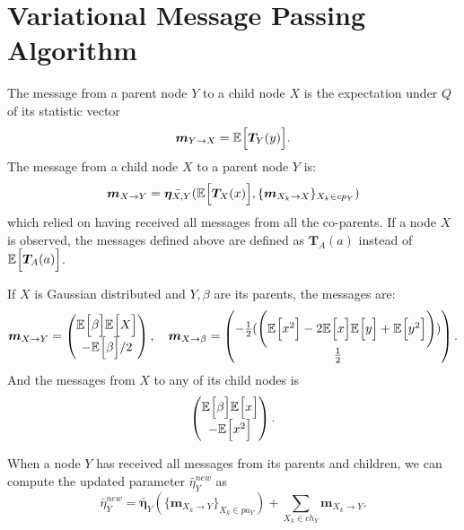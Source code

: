 \section{Variational Message Passing Algorithm}

The message from a parent node \( Y \) to a child node \( X \) is the expectation under \( Q \) of its statistic vector
\[
      \bm{m}_{Y \to X} = \mathbb{E}_{}\Big[\bm{T}_Y(y)\Big].
\]
The message from a child node \( X \) to a parent node \( Y \) is:
\[
      \bm{m}_{X \to Y} = \bar{\bm{\eta}_{X,Y}}(\mathbb{E}_{}\Big[\bm{T}_X(x)\Big], \{\bm{m}_{X_k \to X}\}_{X_k\in cp_Y})
\]
which relied on having received all messages from all the co-parents. If a node \( X \)  is observed, the messages defined above are defined as \( \bm{T}_A(a) \) instead of \( \mathbb{E}_{}\Big[\bm{T}_A(a)\Big] \).

\begin{exampleth}
     If \( X \) is Gaussian distributed and \( Y, \beta \) are its parents, the messages are:
     \[
           \bm{m}_{X \to Y} = \begin{pmatrix}
                \mathbb{E}_{}\Big[\beta\Big]\mathbb{E}_{}\Big[X\Big]\\
                - \mathbb{E}_{}\Big[\beta\Big]/2
           \end{pmatrix}, \quad
           \bm{m}_{X \to \beta} = \begin{pmatrix}
               -\frac{1}{2}(\Bigg( \mathbb{E}_{}\Big[x^2\Big] - 2\mathbb{E}_{}\Big[x\Big]\mathbb{E}_{}\Big[y\Big] + \mathbb{E}_{}\Big[y^2\Big] \Bigg))\\
               \frac{1}{2}
          \end{pmatrix}.
     \]
     And the messages from \( X \) to any of its child nodes is 
     \[
          \begin{pmatrix}
               \mathbb{E}_{}\Big[\beta\Big]\mathbb{E}_{}\Big[x\Big]\\
               - \mathbb{E}_{}\Big[x^2\Big]
          \end{pmatrix}.
     \]
\end{exampleth}

When a node \( Y \) has received all messages from its parents and children, we can compute the updated parameter \( \bar{\eta}^{new}_Y \) as
\[
     \bar{\eta}^{new}_Y = \bar{\bm{\eta}}_Y(\{ \bm{m}_{X_k \to Y} \}_{X_k \in pa_Y}) + \sum_{X_k \in ch_Y}\bm{m}_{X_k \to Y}.
\] 

\cite{winn2005variational}